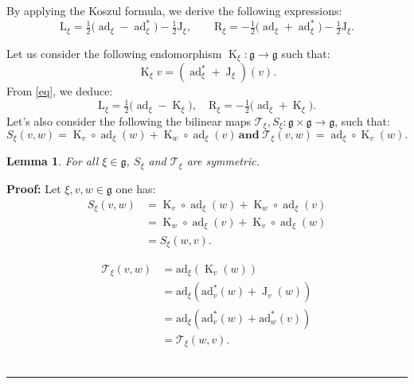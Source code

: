 \documentclass[10pt]{article}
\newtheorem{Lemma}{Lemma}
\newenvironment{proof}[1][Proof]{\textbf{#1:} }{\ \rule{0.5em}{0.5em}}
\begin{document}
By applying the Koszul formula, we derive the following expressions:  
\begin{equation}\label{eq}
\mathrm{L}_\xi = \tfrac12\bigl(\operatorname{ad}_\xi - \operatorname{ad}^*_\xi \bigr) - \tfrac12 \mathrm{J}_\xi,\qquad
\mathrm{R}_\xi = -\tfrac12\bigl(\operatorname{ad}_\xi + \operatorname{ad}^*_\xi \bigr) - \tfrac12 \mathrm{J}_\xi.
\end{equation}

Let us consider the following endomorphism
$ \operatorname{K}_\xi:\mathfrak{g}\longrightarrow \mathfrak{g}$ such that: $$ \operatorname{K}_{\xi}v=(\operatorname{ad}_\xi^*+\operatorname{J}_\xi)(v).$$
From \eqref{eq}, we deduce:
\begin{equation}
\mathrm{L}_\xi = \tfrac12\bigl(\operatorname{ad}_\xi - \operatorname{K}_\xi \bigr) ,\quad
\mathrm{R}_\xi = -\tfrac12\bigl(\operatorname{ad}_\xi + \operatorname{K}_\xi \bigr).
\end{equation}
Let's also consider the following the bilinear maps $\mathscr{T}_\xi, S_\xi:\mathfrak{g}\times\mathfrak{g}\longrightarrow \mathfrak{g}$, such that:
$$S_\xi(v,w)=\operatorname{K}_v\circ \operatorname{ad}_\xi (w)+ \operatorname{K}_w\circ \operatorname{ad}_\xi (v)\, \textbf{and}\;\mathscr{T}_\xi(v,w)=\operatorname{ad}_\xi\circ \operatorname{K}_v(w).$$
\begin{Lemma}\label{L1}
For all $\xi\in \mathfrak{g}$, $S_\xi$ and $\mathscr{T}_\xi$ are symmetric.
\end{Lemma}
\begin{proof} 
Let $\xi, v, w\in \mathfrak{g}$ one has:
\begin{align*} 
S_\xi(v,w) &= \operatorname{K}_v\circ \operatorname{ad}_\xi (w)+ \operatorname{K}_w\circ \operatorname{ad}_\xi (v) \\ 
&= \operatorname{K}_w\circ \operatorname{ad}_\xi (v)+ \operatorname{K}_v\circ \operatorname{ad}_\xi (w)\\ 
&= S_\xi(w,v).
\end{align*}

\begin{align*} 
\mathscr{T}_\xi(v,w) &= \mathrm{ad}_\xi \left( \operatorname{K}_v(w) \right) \\ 
&= \mathrm{ad}_\xi \left( \mathrm{ad}_v^*(w) + \operatorname{J}_v(w) \right) \\ 
&= \mathrm{ad}_\xi \left( \mathrm{ad}_v^*(w) + \mathrm{ad}_w^*(v) \right)\\  
&= \mathscr{T}_\xi(w,v).
\end{align*}
\end{proof} 
\end{document}
